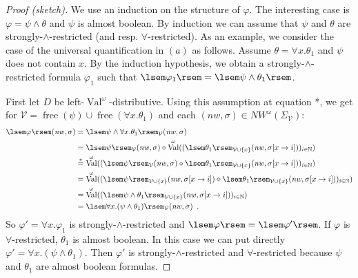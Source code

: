 \documentclass[runningheads, envcountsame, a4paper]{llncs}
\DeclareMathOperator{\Val}{Val}
\DeclareMathOperator{\free}{free}
\begin{document}
\begin{proof}[Proof (sketch)]
	We use an induction on the structure of $\varphi$. The interesting case is $\varphi=\psi \wedge \theta$ and $\psi$ is almost boolean.
By induction we can assume that $\psi$ and $\theta$ are strongly-$\wedge$-restricted (and resp. $\forall$-restricted).
As an example,
we consider the case of the universal quantification in $(a)$ as follows.
Assume $\theta=\forall x.\theta_1$ and $\psi$ does not contain $x$.
By the induction hypothesis, we obtain a strongly-$\wedge$-restricted formula $\varphi_1$ such that $\lsem \varphi_1 \rsem = \lsem \psi \wedge \theta_1 \rsem$.
\par 
First let $D$ be left-$\Val^\omega$-distributive. Using this assumption at equation *, we get for $\mathcal{V}=\free(\psi) \cup \free(\forall x.\theta_1)$ and each $(\mathit{nw},\sigma)\in \mathit{NW^\omega}(\Sigma_\mathcal{V})$:
\begin{align*} \lsem \varphi \rsem(\mathit{nw}, \sigma)
	&=\lsem \psi \wedge \forall x.\theta_1\rsem_{\mathcal{V}}(\mathit{nw}, \sigma) \\
	&= \lsem \psi \rsem_{\mathcal{V}}(\mathit{nw}, \sigma) \diamond \Val^\omega((\lsem \theta_1 \rsem_{\mathcal{V}\cup \{x\} }(\mathit{nw},\sigma [x \rightarrow i]))_{i \in \mathbb{N}}) \\
	&\stackrel{*}{=} \Val^\omega((\lsem \psi \rsem_{\mathcal{V}}(\mathit{nw}, \sigma) \diamond \lsem \theta_1 \rsem_{\mathcal{V}\cup \{x\} }(\mathit{nw},\sigma [x \rightarrow i]))_{i \in \mathbb{N}}) \\
	&= \Val^\omega((\lsem \psi \rsem_{\mathcal{V}\cup\{x\}}(\mathit{nw}, \sigma[x \rightarrow i]) \diamond \lsem \theta_1 \rsem_{\mathcal{V}\cup \{x\} }(\mathit{nw},\sigma [x \rightarrow i]))_{i \in \mathbb{N}}) \\
	&= \Val^\omega((\lsem \psi \wedge \theta_1 \rsem_{\mathcal{V}\cup \{x\} }(\mathit{nw},\sigma [x \rightarrow i]))_{i \in \mathbb{N}}) \\
	&= \lsem \forall x.(\psi \wedge \theta_1)\rsem_{\mathcal{V}}(\mathit{nw}, \sigma) \enspace .
\end{align*}
So $\varphi'=\forall x. \varphi_1$ is strongly-$\wedge$-restricted and $\lsem \varphi \rsem=\lsem \varphi' \rsem$.
If $\varphi$ is $\forall$-restricted, $\theta_1$ is almost boolean. In this case we can put directly $\varphi'=\forall x.(\psi \wedge \theta_1)$. Then $\varphi'$ is strongly-$\wedge$-restricted and $\forall$-restricted because $\psi$ and $\theta_1$ are almost boolean formulas.
\par

\end{proof}
\end{document}
